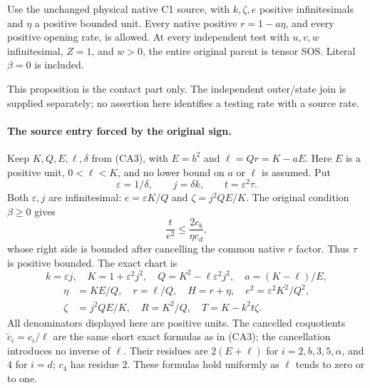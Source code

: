 \begin{proposition}
Use the unchanged physical native C1 source, with $k,\zeta,e$ positive
infinitesimals and $\eta$ a positive bounded unit. Every native positive
$r=1-a\eta$, and every positive opening rate, is allowed.
At every independent test with $u,v,w$ infinitesimal, $Z=1$, and $w>0$,
the entire original parent is tensor SOS. Literal $\beta=0$ is included.
\end{proposition}
This proposition is the contact part only. The independent outer/state
join is supplied separately; no assertion here identifies a testing rate
with a source rate.

\paragraph{The source entry forced by the original sign.}
Keep $K,Q,E,\ell,\delta$ from (CA3), with $E=b^2$ and
$\ell=Qr=K-aE$. Here $E$ is a positive unit, $0<\ell<K$, and no lower
bound on $a$ or $\ell$ is assumed. Put
\[
 \varepsilon=1/\delta,\qquad j=\delta k,\qquad t=\varepsilon^2\tau.
\]
Both $\varepsilon,j$ are infinitesimal: $e=\varepsilon K/Q$ and
$\zeta=j^2QE/K$. The original condition $\beta\ge0$ gives
\[
 \frac{t}{e^2}\le\frac{2c_b}{\eta c_d},
\]
whose right side is bounded after cancelling the common native $r$
factor. Thus $\tau$ is positive bounded. The exact chart is
\[
 k=\varepsilon j,\quad K=1+\varepsilon^2j^2,\quad
 Q=K^2-\ell\varepsilon^2j^2,\quad a=(K-\ell)/E,
\]
\begin{align*}
 \eta&=KE/Q,\quad r=\ell/Q,\quad H=r+\eta,\quad
 e^2=\varepsilon^2K^2/Q^2,\\
 \zeta&=j^2QE/K,\quad R=K^2/Q,\quad T=K-k^2t\zeta. \tag{SE1}
\end{align*}
All denominators displayed here are positive units. The cancelled
coquotients $\widetilde c_i=c_i/\ell$ are the same short exact formulas
as in (CA3); the cancellation introduces no inverse of $\ell$.
Their residues are $2(E+\ell)$ for $i=2,b,3,5,\alpha$, and $4$ for
$i=d$; $c_4$ has residue $2$. These formulas hold uniformly as
$\ell$ tends to zero or to one.


